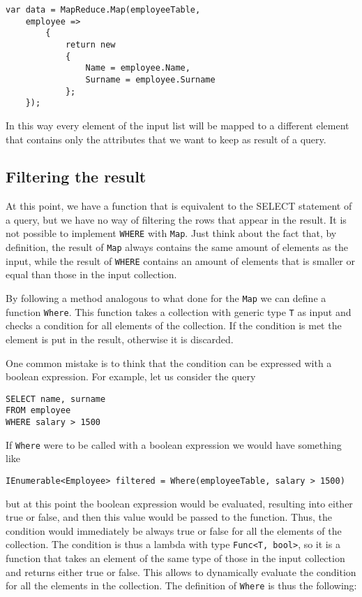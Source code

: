 \begin{lstlisting}
var data = MapReduce.Map(employeeTable,
	employee =>
		{
			return new
			{
				Name = employee.Name,
				Surname = employee.Surname
			};
	});
\end{lstlisting}

In this way every element of the input list will be mapped to a different element that contains only the attributes that we want to keep as result of a query.

\subsection{Filtering the result}
\label{subsec:filter}
At this point, we have a function that is equivalent to the SELECT statement of a query, but we have no way of filtering the rows that appear in the result. It is not possible to implement \texttt{WHERE} with \texttt{Map}. Just think about the fact that, by definition, the result of \texttt{Map} always contains the same amount of elements as the input, while the result of \texttt{WHERE} contains an amount of elements that is smaller or equal than those in the input collection.

By following a method analogous to what done for the \texttt{Map} we can define a function \texttt{Where}. This function takes a collection with generic type \texttt{T} as input and checks a condition for all elements of the collection. If the condition is met the element is put in the result, otherwise it is discarded.

One common mistake is to think that the condition can be expressed with a boolean expression. For example, let us consider the query

\begin{lstlisting}[caption = Query with filtering, label = code:where_query]
SELECT name, surname
FROM employee
WHERE salary > 1500
\end{lstlisting}

\noindent
If \texttt{Where} were to be called with a boolean expression we would have something like

\begin{lstlisting}
IEnumerable<Employee> filtered = Where(employeeTable, salary > 1500)
\end{lstlisting}

\noindent
but at this point the boolean expression would be evaluated, resulting into either true or false, and then this value would be passed to the function. Thus, the condition would immediately be always true or false for all the elements of the collection. The condition is thus a lambda with type \texttt{Func<T, bool>}, so it is a function that takes an element of the same type of those in the input collection and returns either true or false. This allows to dynamically evaluate the condition for all the elements in the collection. The definition of \texttt{Where} is thus the following:

